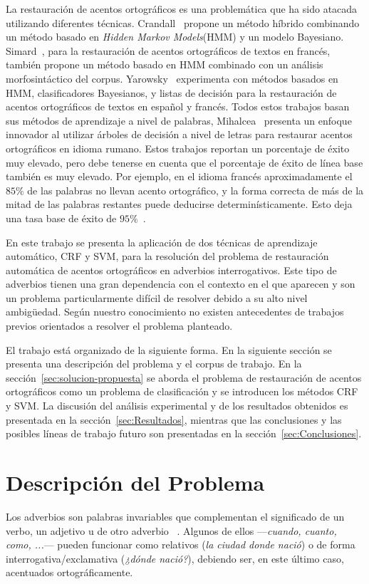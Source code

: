 \documentclass[runningheads,a4paper]{llncs}
\begin{document}
La restauración de acentos ortográficos es una problemática que ha sido atacada utilizando diferentes técnicas. Crandall~\cite{CRANDALL95} propone un método híbrido combinando un método basado en \emph{Hidden Markov Models}(HMM) y un modelo Bayesiano. Simard~\cite{SIMARD98}, para la restauración de acentos ortográficos de textos en francés, también propone un método basado en HMM combinado con un análisis morfosintáctico del corpus. Yarowsky~\cite{YAROWSKY94,YAROWSKY94-2} experimenta con métodos basados en HMM, clasificadores Bayesianos, y listas de decisión para la restauración de acentos ortográficos de textos en español y francés. Todos estos trabajos basan sus métodos de aprendizaje a nivel de palabras, Mihalcea~\cite{MIHALCEA02} presenta un enfoque innovador al utilizar árboles de decisión a nivel de letras para restaurar acentos ortográficos en idioma rumano. Estos trabajos reportan un porcentaje de éxito muy elevado, pero debe tenerse en cuenta que el porcentaje de éxito de línea base también es muy elevado. Por ejemplo, en el idioma francés aproximadamente el $85\%$ de las palabras no llevan acento ortográfico, y la forma correcta de más de la mitad de las palabras restantes puede deducirse determinísticamente. Esto deja una tasa base de éxito de $95\%$~\cite{SIMARD98}.

En este trabajo se presenta la aplicación de dos técnicas de aprendizaje automático, CRF y SVM, para la resolución del problema de restauración automática de acentos ortográficos en adverbios interrogativos. Este tipo de adverbios tienen una gran dependencia con el contexto en el que aparecen y son un problema particularmente difícil de resolver debido a su alto nivel ambigüedad. Según nuestro conocimiento no existen antecedentes de trabajos previos orientados a resolver el problema planteado.

El trabajo está organizado de la siguiente forma. En la siguiente sección se presenta una descripción del problema y el corpus de trabajo. En la sección~\ref{sec:solucion-propuesta} se aborda el problema de restauración de acentos ortográficos como un problema de clasificación y se introducen los métodos CRF y SVM. La discusión del análisis experimental y de los resultados obtenidos es presentada en la sección~\ref{sec:Resultados}, mientras que las conclusiones y las posibles líneas de trabajo futuro son presentadas en la sección~\ref{sec:Conclusiones}.

\section{Descripción del Problema}
Los adverbios son palabras invariables que complementan el significado de un verbo, un adjetivo u de otro adverbio ~\cite{RAE}. Algunos de ellos ---\emph{cuando, cuanto, como, ...}--- pueden funcionar como relativos (\emph{la ciudad donde nació}) o de forma interrogativa/exclamativa (\emph{¿dónde nació?}), debiendo ser, en este último caso,  acentuados ortográficamente. 
\end{document}

